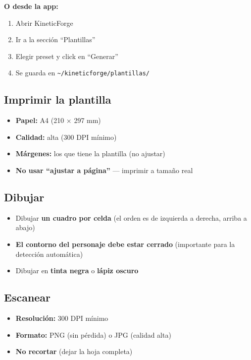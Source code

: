 \documentclass[12pt,a4paper]{article}
\begin{document}
\textbf{O desde la app:}
\begin{enumerate}[leftmargin=*]
    \item Abrir KineticForge
    \item Ir a la sección ``Plantillas''
    \item Elegir preset y click en ``Generar''
    \item Se guarda en \texttt{\textasciitilde/kineticforge/plantillas/}
\end{enumerate}

\subsection{Imprimir la plantilla}
\begin{itemize}[leftmargin=*]
    \item \textbf{Papel:} A4 (210 × 297 mm)
    \item \textbf{Calidad:} alta (300 DPI mínimo)
    \item \textbf{Márgenes:} los que tiene la plantilla (no ajustar)
    \item \textbf{No usar ``ajustar a página''} — imprimir a tamaño real
\end{itemize}

\subsection{Dibujar}
\begin{itemize}[leftmargin=*]
    \item Dibujar \textbf{un cuadro por celda} (el orden es de izquierda a derecha, arriba a abajo)
    \item \textbf{El contorno del personaje debe estar cerrado} (importante para la detección automática)
    \item Dibujar en \textbf{tinta negra} o \textbf{lápiz oscuro}
\end{itemize}

\subsection{Escanear}
\begin{itemize}[leftmargin=*]
    \item \textbf{Resolución:} 300 DPI mínimo
    \item \textbf{Formato:} PNG (sin pérdida) o JPG (calidad alta)
    \item \textbf{No recortar} (dejar la hoja completa)
\end{itemize}
\end{document}
